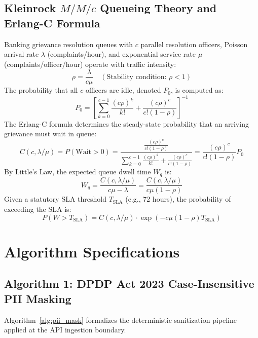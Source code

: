 \subsection{Kleinrock $M/M/c$ Queueing Theory and Erlang-C Formula}
Banking grievance resolution queues with $c$ parallel resolution officers, Poisson arrival rate $\lambda$ (complaints/hour), and exponential service rate $\mu$ (complaints/officer/hour) operate with traffic intensity:
\begin{equation}
\rho = \frac{\lambda}{c \mu} \quad (\text{Stability condition: } \rho < 1)
\end{equation}
The probability that all $c$ officers are idle, denoted $P_0$, is computed as:
\begin{equation}
P_0 = \left[ \sum_{k=0}^{c-1} \frac{(c\rho)^k}{k!} + \frac{(c\rho)^c}{c!(1-\rho)} \right]^{-1}
\end{equation}
The Erlang-C formula determines the steady-state probability that an arriving grievance must wait in queue:
\begin{equation}
C(c, \lambda/\mu) = P(\text{Wait} > 0) = \frac{\frac{(c\rho)^c}{c!(1-\rho)}}{\sum_{k=0}^{c-1} \frac{(c\rho)^k}{k!} + \frac{(c\rho)^c}{c!(1-\rho)}} = \frac{(c\rho)^c}{c!(1-\rho)} P_0
\end{equation}
By Little's Law, the expected queue dwell time $W_q$ is:
\begin{equation}
W_q = \frac{C(c, \lambda/\mu)}{c\mu - \lambda} = \frac{C(c, \lambda/\mu)}{c\mu(1 - \rho)}
\end{equation}
Given a statutory SLA threshold $T_{\text{SLA}}$ (e.g., 72 hours), the probability of exceeding the SLA is:
\begin{equation}
P(W > T_{\text{SLA}}) = C(c, \lambda/\mu) \cdot \exp\left( -c\mu(1 - \rho) T_{\text{SLA}} \right)
\end{equation}

\section{Algorithm Specifications}

\subsection{Algorithm 1: DPDP Act 2023 Case-Insensitive PII Masking}
Algorithm~\ref{alg:pii_mask} formalizes the deterministic sanitization pipeline applied at the API ingestion boundary.

